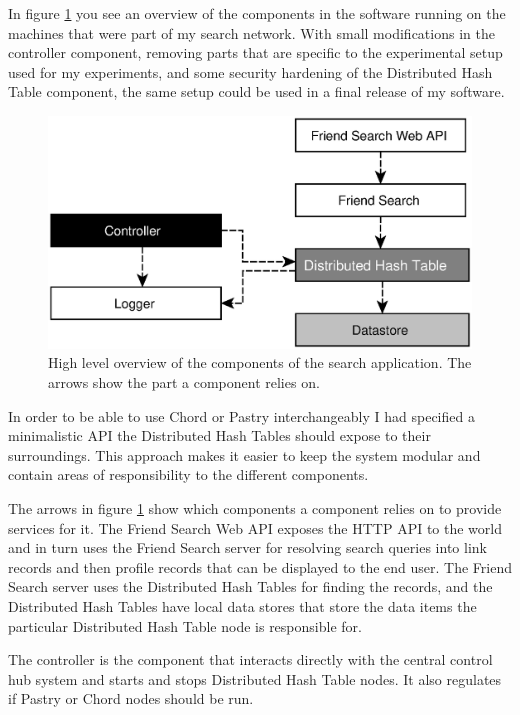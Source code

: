 In figure \ref{figComponents} you see an overview of the components in the software running on the machines that were part of my search network. With small modifications in the controller component, removing parts that are specific to the experimental setup used for my experiments, and some security hardening of the Distributed Hash Table component, the same setup could be used in a final release of my software.

\begin{figure}[!htb]
\begin{center}
	\includegraphics[width=0.9\linewidth]{illustrations/ComponentOverview.eps}
\caption{High level overview of the components of the search application. The arrows show the part a component relies on.}
\label{figComponents}
\end{center}
\end{figure}

In order to be able to use Chord or Pastry interchangeably I had specified a minimalistic API the Distributed Hash Tables should expose to their surroundings. This approach makes it easier to keep the system modular and contain areas of responsibility to the different components.

The arrows in figure \ref{figComponents} show which components a component relies on to provide services for it. The Friend Search Web API exposes the HTTP API to the world and in turn uses the Friend Search server for resolving search queries into link records and then profile records that can be displayed to the end user. The Friend Search server uses the Distributed Hash Tables for finding the records, and the Distributed Hash Tables have local data stores that store the data items the particular Distributed Hash Table node is responsible for.

The controller is the component that interacts directly with the central control hub system and starts and stops Distributed Hash Table nodes. It also regulates if Pastry or Chord nodes should be run.

